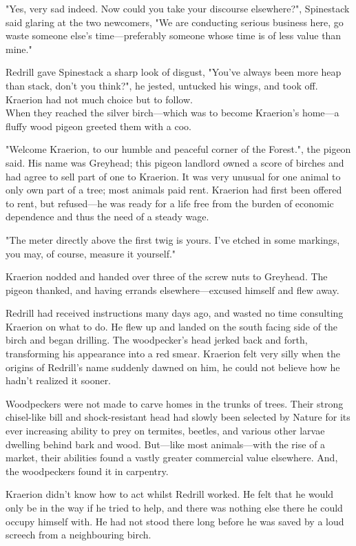 "Yes, very sad indeed. Now could you take your discourse elsewhere?", Spinestack said glaring at the two newcomers, "We are conducting serious business here, go waste someone else's time---preferably someone whose time is of less value than mine."

Redrill gave Spinestack a sharp look of disgust, "You've always been more heap than stack, don't you think?", he jested, untucked his wings, and took off. Kraerion had not much choice but to follow.\\

When they reached the silver birch---which was to become Kraerion's home---a fluffy wood pigeon greeted them with a coo. 

"Welcome Kraerion, to our humble and peaceful corner of the Forest.", the pigeon said. His name was Greyhead; this pigeon landlord owned a score of birches and had agree to sell part of one to Kraerion. It was very unusual for one animal to only own part of a tree; most animals paid rent. Kraerion had first been offered to rent, but refused---he was ready for a life free from the burden of economic dependence and thus the need of a steady wage.

"The meter directly above the first twig is yours. I've etched in some markings, you may, of course, measure it yourself."

Kraerion nodded and handed over three of the screw nuts to Greyhead. The pigeon thanked, and having errands elsewhere---excused himself and flew away.

Redrill had received instructions many days ago, and wasted no time consulting Kraerion on what to do. He flew up and landed on the south facing side of the birch and began drilling. The woodpecker's head jerked back and forth, transforming his appearance into a red smear. Kraerion felt very silly when the origins of Redrill's name suddenly dawned on him, he could not believe how he hadn't realized it sooner.

Woodpeckers were not made to carve homes in the trunks of trees. Their strong chisel-like bill and shock-resistant head had slowly been selected by Nature for its ever increasing ability to prey on termites, beetles, and various other larvae dwelling behind bark and wood. But---like most animals---with the rise of a market, their abilities found a vastly greater commercial value elsewhere. And, the woodpeckers found it in carpentry.

Kraerion didn't know how to act whilst Redrill worked. He felt that he would only be in the way if he tried to help, and there was nothing else there he could occupy himself with. He had not stood there long before he was saved by a loud screech from a neighbouring birch.

